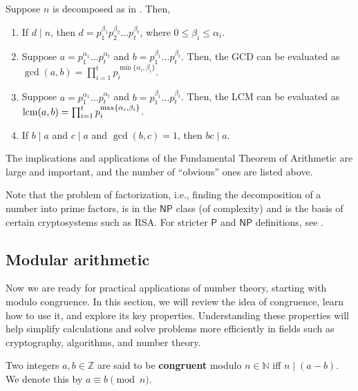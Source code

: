 \documentclass[../../book.tex]{subfiles}
\begin{document}
\begin{corollary}
    Suppose $n$ is decomposed as in . Then,

    \begin{enumerate}
        \item If $d \mid n$, then $d = p_{1}^{\beta_1}p_{2}^{\beta_2} \dots p_{t}^{\beta_t}$, where $0 \leq \beta_i \leq \alpha_i$.
        \item Suppose $a = p_{1}^{\alpha_1} \dots p_{t}^{\alpha_t}$ and $b = p_{1}^{\beta_1} \dots p_{t}^{\beta_t}$. Then, the GCD can be evaluated as $\gcd(a, b) = \prod_{i=1}^{t}p_i^{\min\{\alpha_i, \beta_i\}}$.
        \item Suppose $a = p_{1}^{\alpha_1} \dots p_{t}^{\alpha_t}$ and $b = p_{1}^{\beta_1} \dots p_{t}^{\beta_t}$. Then, the LCM can be evaluated as $\text{lcm}(a, b) = \prod_{i=1}^{t}p_i^{\max\{\alpha_i, \beta_i\}}$.
        \item If $b \mid a$ and $c \mid a$ and $\gcd(b, c) = 1$, then $bc \mid a$.
    \end{enumerate}
\end{corollary}

The implications and applications of the Fundamental Theorem of Arithmetic are
large and important, and the number of ``obvious'' ones are listed above. 
\begin{remark}
    Note that the problem of factorization, i.e., finding the decomposition of a
number into prime factors, is in the $\mathsf{NP}$ class (of complexity) and is the basis
of certain cryptosystems such as RSA. For stricter $\mathsf{P}$ and $\mathsf{NP}$ definitions, see 
.
\end{remark}

\subsection{Modular arithmetic}

Now we are ready for practical applications of number theory, starting with modulo congruence.
In this section, we will review the idea of congruence, learn how to use it, and explore
its key properties. Understanding these properties will help simplify calculations and solve 
problems more efficiently in fields such as cryptography, algorithms, and number theory.

\begin{definition}
    Two integers $a, b \in \mathbb{Z}$ are said to be \textbf{congruent} modulo
    $n \in \mathbb{N}$ iff $n \mid (a-b)$. We denote this by $a \equiv b
    \pmod{n}$.
\end{definition}
\end{document}
